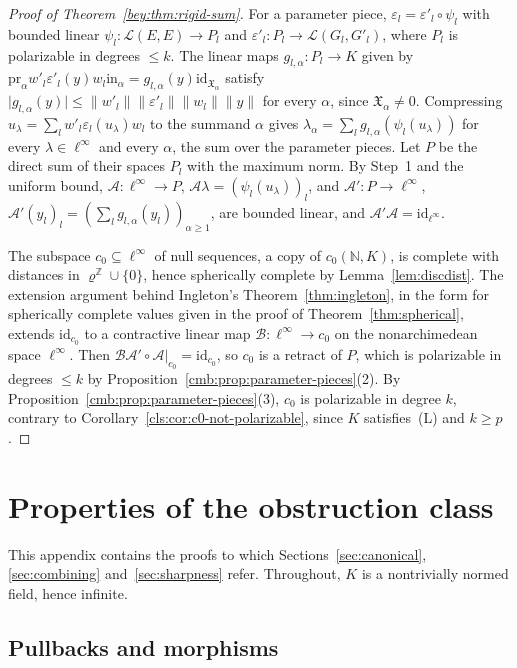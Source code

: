\documentclass[11pt]{amsart}
\theoremstyle{definition}
\theoremstyle{remark}
\numberwithin{equation}{section}
\newcommand{\N}{\mathbb N}
\newcommand{\Z}{\mathbb Z}
\newcommand{\cL}{\mathcal L}
\newcommand{\linf}{\ell^\infty}
\newcommand{\id}{\mathrm{id}}
\newcommand{\abs}[1]{\lvert #1\rvert}
\newcommand{\norm}[1]{\lVert #1\rVert}
\theoremstyle{plain}
\theoremstyle{definition}
\theoremstyle{plain}
\newcommand{\fX}{\mathfrak X}
\begin{document}
\begin{proof}[Proof of Theorem~\textup{\ref{bey:thm:rigid-sum}}]
For a parameter piece, $\varepsilon_l=\varepsilon'_l\circ\psi_l$ with bounded linear $\psi_l\colon\cL(E,E)\to P_l$ and
$\varepsilon'_l\colon P_l\to\cL(G_l,G'_l)$, where $P_l$ is polarizable in degrees $\le k$. The linear maps
$g_{l,\alpha}\colon P_l\to K$ given by
$\mathrm{pr}_\alpha w'_l\varepsilon'_l(y)w_l\mathrm{in}_\alpha=g_{l,\alpha}(y)\id_{\fX_\alpha}$ satisfy
$\abs{g_{l,\alpha}(y)}\le\norm{w'_l}\norm{\varepsilon'_l}\norm{w_l}\norm y$ for every $\alpha$, since $\fX_\alpha\ne0$.
Compressing $u_\lambda=\sum_lw'_l\varepsilon_l(u_\lambda)w_l$ to the summand $\alpha$ gives
$\lambda_\alpha=\sum_lg_{l,\alpha}(\psi_l(u_\lambda))$ for every $\lambda\in\linf$ and every $\alpha$, the sum over the
parameter pieces. Let $P$ be the direct sum of their spaces $P_l$ with the maximum norm. By Step~1 and the uniform
bound, $\mathcal A\colon\linf\to P$, $\mathcal A\lambda=(\psi_l(u_\lambda))_l$, and $\mathcal A'\colon P\to\linf$,
$\mathcal A'(y_l)_l=(\sum_lg_{l,\alpha}(y_l))_{\alpha\ge1}$, are bounded linear, and $\mathcal A'\mathcal A=\id_{\linf}$.

The subspace $c_0\subseteq\linf$ of null sequences, a copy of $c_0(\N,K)$, is complete with distances in
$\varrho^\Z\cup\{0\}$, hence spherically complete by Lemma~\ref{lem:discdist}. The extension argument behind Ingleton's
Theorem~\ref{thm:ingleton}, in the form for spherically complete values given in the proof of
Theorem~\ref{thm:spherical}, extends $\id_{c_0}$ to a contractive linear map $\mathcal B\colon\linf\to c_0$ on the
nonarchimedean space $\linf$. Then $\mathcal B\mathcal A'\circ\mathcal A|_{c_0}=\id_{c_0}$, so $c_0$ is a retract of
$P$, which is polarizable in degrees $\le k$ by Proposition~\ref{cmb:prop:parameter-pieces}(2). By
Proposition~\ref{cmb:prop:parameter-pieces}(3), $c_0$ is polarizable in degree $k$, contrary to
Corollary~\ref{cls:cor:c0-not-polarizable}, since $K$ satisfies~\textup{(L)} and $k\ge p$.
\end{proof}
\section{Properties of the obstruction class}\label{app:obstruction-class}

This appendix contains the proofs to which Sections~\ref{sec:canonical}, \ref{sec:combining} and~\ref{sec:sharpness}
refer. Throughout, $K$ is a nontrivially normed field, hence infinite.

\subsection{Pullbacks and morphisms}\label{ocl:ssec:sequences}
\end{document}
